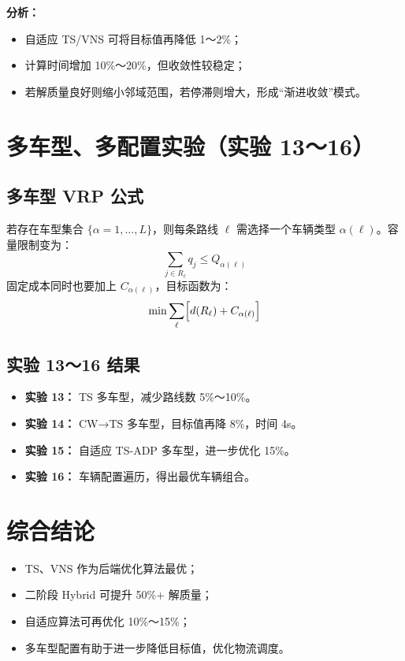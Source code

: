 \documentclass[12pt,a4paper,twoside]{ctexbook}
\begin{document}
\textbf{分析：}
\begin{itemize}
    \item 自适应 TS/VNS 可将目标值再降低 1～2\%；
    \item 计算时间增加 10\%～20\%，但收敛性较稳定；
    \item 若解质量良好则缩小邻域范围，若停滞则增大，形成“渐进收敛”模式。
\end{itemize}

\section{多车型、多配置实验（实验 13～16）}
\subsection{多车型 VRP 公式}
若存在车型集合 $\{\alpha = 1,\dots,L\}$，则每条路线 $\ell$ 需选择一个车辆类型 $\alpha(\ell)$。容量限制变为：
\[
\sum_{j\in R_\ell} q_j \le Q_{\alpha(\ell)}
\]
固定成本同时也要加上 $C_{\alpha(\ell)}$，目标函数为：
\[
\min \sum_{\ell} \Bigl[d(R_\ell) + C_{\alpha(\ell)}\Bigr]
\]

\subsection{实验 13～16 结果}
\begin{itemize}
    \item \textbf{实验 13：} TS 多车型，减少路线数 5\%～10\%。
    \item \textbf{实验 14：} CW→TS 多车型，目标值再降 8\%，时间 4s。
    \item \textbf{实验 15：} 自适应 TS-ADP 多车型，进一步优化 15\%。
    \item \textbf{实验 16：} 车辆配置遍历，得出最优车辆组合。
\end{itemize}

\section{综合结论}
\begin{itemize}
    \item TS、VNS 作为后端优化算法最优；
    \item 二阶段 Hybrid 可提升 50\%+ 解质量；
    \item 自适应算法可再优化 10\%～15\%；
    \item 多车型配置有助于进一步降低目标值，优化物流调度。
\end{itemize}
\end{document}
